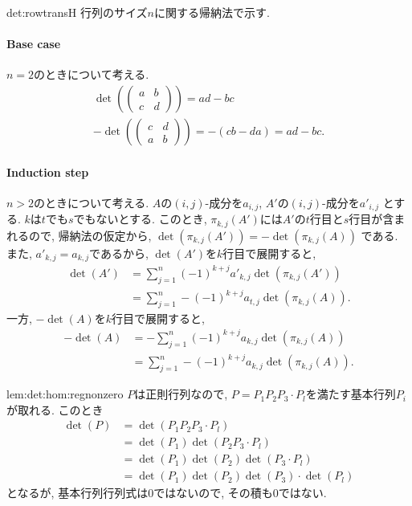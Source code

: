 \begin{proofof*}{det:rowtrans}{H}
  行列のサイズ$n$に関する帰納法で示す.
  \paragraph{Base case}
  $n=2$のときについて考える.
  \begin{align*}
    \det(
    \begin{pmatrix}
      a&b\\
      c&d
    \end{pmatrix}
    )=ad-bc\\
    -\det(
    \begin{pmatrix}
      c&d\\
      a&b
    \end{pmatrix}
    )=-(cb-da)=ad-bc.
  \end{align*}
  \paragraph{Induction step}
  $n>2$のときについて考える.
  $A$の$(i,j)$-成分を$a_{i,j}$,
  $A'$の$(i,j)$-成分を$a'_{i,j}$
  とする.
  $k$は$t$でも$s$でもないとする.
  このとき,
  $\pi_{k,j}(A')$には$A'$の$t$行目と$s$行目が含まれるので,
  帰納法の仮定から,
  $\det(\pi_{k,j}(A'))=-\det(\pi_{k,j}(A))$
  である.
  また, $a'_{k,j}=a_{k,j}$であるから,
  $\det(A')$を$k$行目で展開すると,
  \begin{align*}
    \det(A')
    &=\sum_{j=1}^{n} (-1)^{k+j} a'_{k,j}\det(\pi_{k,j}(A'))\\
    &=\sum_{j=1}^{n} -(-1)^{k+j} a_{t,j}\det(\pi_{k,j}(A)).
  \end{align*}
  一方, $-\det(A)$を$k$行目で展開すると,
  \begin{align*}
    -\det(A)
    &=-\sum_{j=1}^{n} (-1)^{k+j} a_{k,j}\det(\pi_{k,j}(A))\\
    &=\sum_{j=1}^{n} -(-1)^{k+j} a_{k,j}\det(\pi_{k,j}(A)).
  \end{align*}  
\end{proofof*}


\begin{proofof*}{lem:det:hom:reg}{nonzero}
  $P$は正則行列なので, $P=P_1P_2P_3\cdot P_l$を満たす基本行列$P_i$が取れる.
  このとき
  \begin{align*}
    \det(P)
    &=\det(P_1P_2P_3\cdot P_l)\\
    &=\det(P_1)\det(P_2P_3\cdot P_l)\\
    &=\det(P_1)\det(P_2)\det(P_3\cdot P_l)\\
    &=\det(P_1)\det(P_2)\det(P_3)\cdot \det(P_l)
  \end{align*}
  となるが, 基本行列行列式は$0$ではないので, その積も$0$ではない.
\end{proofof*}

